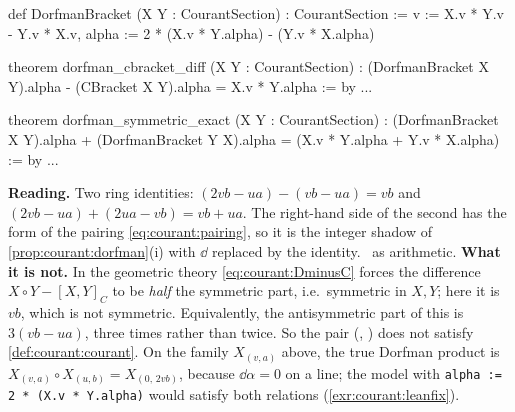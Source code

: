 \begin{leanbox}
\begin{leancode}
def DorfmanBracket (X Y : CourantSection) : CourantSection :=
  { v := X.v * Y.v - Y.v * X.v,
    alpha := 2 * (X.v * Y.alpha) - (Y.v * X.alpha) }

theorem dorfman_cbracket_diff (X Y : CourantSection) :
    (DorfmanBracket X Y).alpha - (CBracket X Y).alpha
      = X.v * Y.alpha := by ...

theorem dorfman_symmetric_exact (X Y : CourantSection) :
    (DorfmanBracket X Y).alpha + (DorfmanBracket Y X).alpha =
    (X.v * Y.alpha + Y.v * X.alpha) := by ...
\end{leancode}
\textbf{Reading.} Two ring identities: $(2vb-ua)-(vb-ua)=vb$ and $(2vb-ua)+(2ua-vb)=vb+ua$. The
right-hand side of the second has the form of the pairing \eqref{eq:courant:pairing}, so it is
the integer shadow of
\cref{prop:courant:dorfman}(i) with $\dd$ replaced by the identity. \TA\ as arithmetic.
\textbf{What it is not.} In the geometric theory \eqref{eq:courant:DminusC} forces the
difference $X\circ Y-[X,Y]_C$ to be \emph{half} the symmetric part, i.e.\ symmetric in $X,Y$; here
it is $vb$, which is not symmetric. Equivalently, the antisymmetric part of this
 is $3(vb-ua)$, three times  rather than twice. So the pair
(, ) does not satisfy \cref{def:courant:courant}. On the family
$X_{(v,a)}$ above, the true Dorfman product is $X_{(v,a)}\circ X_{(u,b)}=X_{(0,\,2vb)}$, because
$\dd\alpha=0$ on a line; the model with \texttt{alpha := 2 * (X.v * Y.alpha)} would satisfy both
relations (\cref{exr:courant:leanfix}).
\end{leanbox}

